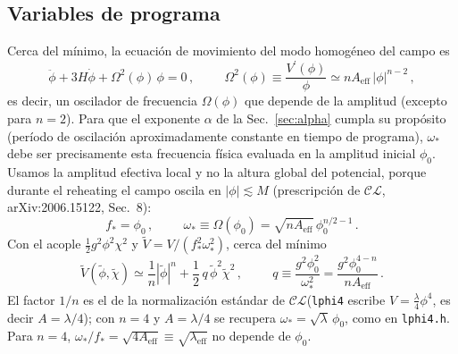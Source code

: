 \documentclass[11pt]{article}
\newcommand{\CosmoLattice}{\ensuremath{\mathcal{C}}\text{osmo}\ensuremath{\mathcal{L}}\text{attice}\xspace}
\begin{document}
        \subsection{Variables de programa}
            \label{sec:variables}

            Cerca del mínimo, la ecuación de movimiento del modo homogéneo del campo es
            \begin{equation}
                \ddot{\phi} + 3 H \dot{\phi} + \Omega^2(\phi) \, \phi = 0 \, ,
                \hspace{1cm}
                \Omega^2(\phi) \equiv \frac{V^\prime(\phi)}{\phi} \simeq n A_{\text{eff}} \, |\phi|^{n-2} \, ,
            \end{equation}
            es decir, un oscilador de frecuencia $\Omega(\phi)$ que depende de la amplitud (excepto para $n=2$). Para que el exponente $\alpha$ de la Sec.~\ref{sec:alpha} cumpla su propósito (período de oscilación aproximadamente constante en tiempo de programa), $\omega_*$ debe ser precisamente esta frecuencia física evaluada en la amplitud inicial $\phi_0$. Usamos la amplitud efectiva local y no la altura global del potencial, porque durante el reheating el campo oscila en $|\phi| \lesssim M$ (prescripción de \CosmoLattice, arXiv:2006.15122, Sec.~8):
            \begin{equation}
                f_* = \phi_0 \, , \hspace{1cm}
                \omega_* \equiv \Omega(\phi_0) = \sqrt{n A_{\text{eff}}} \, \phi_0^{n/2 - 1} \, .
            \end{equation}
            Con el acople $\frac12 g^2\phi^2\chi^2$ y $\tilde V = V/(f_*^2\omega_*^2)$, cerca del mínimo
            \begin{equation}
                \tilde{V} \left( \tilde{\phi}, \tilde{\chi} \right) \simeq \frac{1}{n} \left| \tilde{\phi} \right|^n + \frac{1}{2} \, q \, \tilde{\phi}^2 \tilde{\chi}^2 \, ,
                \hspace{1cm}
                q \equiv \frac{g^2 \phi_0^2}{\omega_*^2} = \frac{g^2 \phi_0^{4-n}}{n A_{\text{eff}}} \, .
            \end{equation}
            El factor $1/n$ es el de la normalización estándar de \CosmoLattice (\texttt{lphi4} escribe $V = \frac{\lambda}{4} \phi^4$, es decir $A = \lambda/4$); con $n=4$ y $A=\lambda/4$ se recupera $\omega_* = \sqrt{\lambda}\,\phi_0$, como en \texttt{lphi4.h}. Para $n = 4$, $\omega_*/f_* = \sqrt{4A_{\text{eff}}} \equiv \sqrt{\lambda_{\text{eff}}}$ no depende de $\phi_0$.
\end{document}
